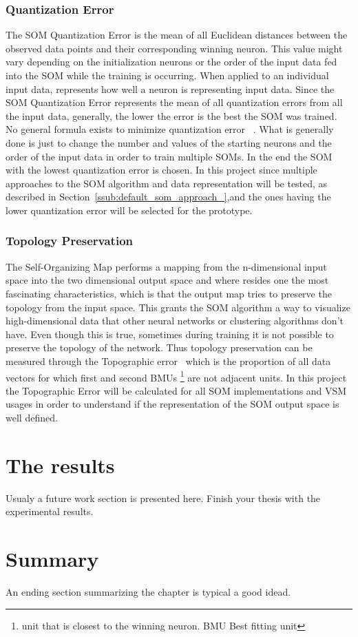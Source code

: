 \subsubsection{Quantization Error} 
\label{ssub:quantization_error}
The SOM Quantization Error is the mean of all Euclidean distances between the observed data points and their corresponding winning neuron. This value might vary depending on the initialization neurons or the order of the input data fed into the SOM while the training is occurring. When applied to an individual input data, represents how well a neuron is representing input data. Since the SOM Quantization Error represents the mean of all quantization errors from all the input data, generally, the lower the error is the best the SOM was trained.
\\
No general formula exists to minimize quantization error~\cite{Bodt} . What is generally done is just to change the number and values of the starting neurons and the order of the input data in order to train multiple SOMs. In the end the SOM with the lowest quantization error is chosen.
In this project since multiple approaches to the SOM algorithm and data representation will be tested, as described in Section~\ref{ssub:default_som_approach_},and the ones having the lower quantization error will be selected for the prototype.

\subsubsection{Topology Preservation} 
\label{ssub:topology_preservation}
The Self-Organizing Map performs a mapping from the n-dimensional input space into the two dimensional output space and where resides one the most fascinating characteristics, which is that the output map tries to preserve the topology from the input space. This grants the SOM algorithm a way to visualize high-dimensional data that other neural networks or clustering algorithms don't have. Even though this is true, sometimes during training it is not possible to preserve the topology of the network.
Thus topology preservation can be measured through the Topographic error~\citet{Kiviluoto1996} which is the proportion of all data vectors for which first and second BMUs \footnote{unit that is closest to the winning neuron. BMU Best fitting unit } are not adjacent units.
In this project the Topographic Error will be calculated for all SOM implementations and VSM usages in order to understand if the representation of the SOM output space is well defined.


\section{The results}
Usualy a future work section is presented here.
Finish your thesis with the experimental results.

\section{Summary}

An ending section summarizing the chapter is typical a good idead.

\cleardoublepage
 
